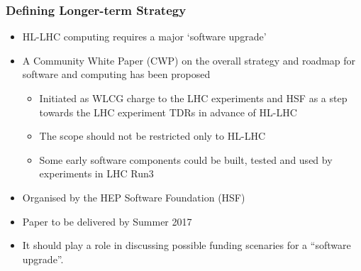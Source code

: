 \begin{frame}
\frametitle{Defining Longer-term Strategy}

\begin{itemize}
\item HL-LHC computing requires a major `software upgrade'
\item A Community White Paper (CWP) on the overall strategy and roadmap 
for software and computing has been proposed
  \begin{itemize}
  \item Initiated as WLCG charge to the LHC experiments and HSF as a step towards the LHC experiment TDRs in advance of HL-LHC
  \item The scope should not be restricted only to HL-LHC
  \item Some early software components could be built, tested and used by experiments in LHC Run3
  \end{itemize}
\item Organised by the HEP Software Foundation (HSF)
\item Paper to be delivered by Summer 2017
\item It should play a role in discussing possible funding scenaries for a ``software upgrade''.
\end{itemize}


\end{frame}


